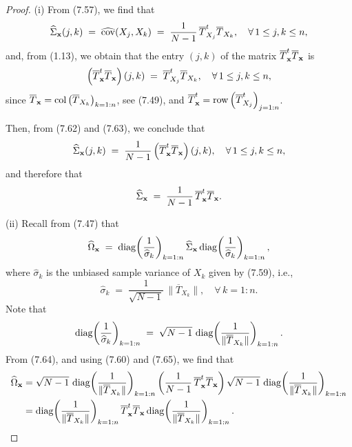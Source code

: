 \begin{proof}
(i) From (7.57), we find that
\begin{equation}
\widehat{\Sigma}_{\mathbf{x}}(j,k) \;=\; \widehat{\operatorname{cov}}(X_j,X_k) \;=\; \frac{1}{N-1}\,\overline{T}^t_{X_j}\overline{T}_{X_k}, \quad \forall\, 1\le j,k\le n,
\end{equation}
and, from (1.13), we obtain that the entry $(j,k)$ of the matrix
$\overline{T}^t_{\mathbf{x}}\overline{T}_{\mathbf{x}}$ is
\begin{equation}
\left(\overline{T}^t_{\mathbf{x}}\overline{T}_{\mathbf{x}}\right)(j,k) \;=\; \overline{T}^t_{X_j}\overline{T}_{X_k}, \quad \forall\, 1\le j,k\le n,
\end{equation}
since $\overline{T}_{\mathbf{x}} = \mathrm{col}\left(\overline{T}_{X_k}\right)_{k=1:n}$, see
(7.49), and $\overline{T}^t_{\mathbf{x}} = \mathrm{row}\left(\overline{T}^t_{X_j}\right)_{j=1:n}$.

Then, from (7.62) and (7.63), we conclude that
\[
\widehat{\Sigma}_{\mathbf{x}}(j,k) \;=\; \frac{1}{N-1}\left(\overline{T}^t_{\mathbf{x}}\overline{T}_{\mathbf{x}}\right)(j,k), \quad \forall\, 1\le j,k\le n,
\]
and therefore that
\[
\widehat{\Sigma}_{\mathbf{x}} \;=\; \frac{1}{N-1}\,\overline{T}^t_{\mathbf{x}}\overline{T}_{\mathbf{x}}.
\]

(ii) Recall from (7.47) that
\begin{equation}
\widehat{\Omega}_{\mathbf{x}} \;=\; \operatorname{diag}\!\left(\frac{1}{\widehat{\sigma}_k}\right)_{k=1:n} \widehat{\Sigma}_{\mathbf{x}} \operatorname{diag}\!\left(\frac{1}{\widehat{\sigma}_k}\right)_{k=1:n},
\end{equation}
where $\widehat{\sigma}_k$ is the unbiased sample variance of $X_k$ given by (7.59),
i.e.,
\[
\widehat{\sigma}_k \;=\; \frac{1}{\sqrt{N-1}}\,\|\overline{T}_{X_k}\|, \quad \forall\, k=1:n.
\]
Note that
\begin{equation}
\operatorname{diag}\!\left(\frac{1}{\widehat{\sigma}_k}\right)_{k=1:n} \;=\; \sqrt{N-1}\,\operatorname{diag}\!\left(\frac{1}{\|\overline{T}_{X_k}\|}\right)_{k=1:n}.
\end{equation}
From (7.64), and using (7.60) and (7.65), we find that
\begin{align*}
\widehat{\Omega}_{\mathbf{x}}
&= \sqrt{N-1}\,\operatorname{diag}\!\left(\frac{1}{\|\overline{T}_{X_k}\|}\right)_{k=1:n} \left(\frac{1}{N-1}\,\overline{T}^t_{\mathbf{x}}\overline{T}_{\mathbf{x}}\right) \sqrt{N-1}\,\operatorname{diag}\!\left(\frac{1}{\|\overline{T}_{X_k}\|}\right)_{k=1:n} \\
&= \operatorname{diag}\!\left(\frac{1}{\|\overline{T}_{X_k}\|}\right)_{k=1:n} \overline{T}^t_{\mathbf{x}}\overline{T}_{\mathbf{x}} \operatorname{diag}\!\left(\frac{1}{\|\overline{T}_{X_k}\|}\right)_{k=1:n}.
\end{align*}
\end{proof}
